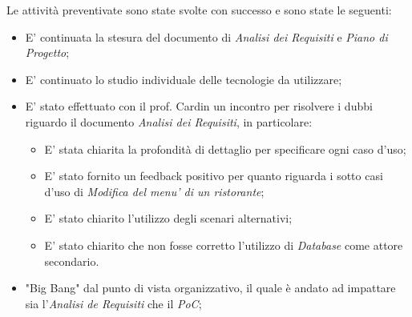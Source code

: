 Le attività preventivate sono state svolte con successo e sono state le seguenti:
\begin{itemize}
    \item E' continuata la stesura del documento di \emph{Analisi dei Requisiti} e \emph{Piano di Progetto};
    \item E' continuato lo studio individuale delle tecnologie da utilizzare;
    \item E' stato effettuato con il prof. Cardin un incontro per risolvere i dubbi riguardo il documento \emph{Analisi dei Requisiti}, in particolare:
    \begin{itemize}
        \item E' stata chiarita la profondità di dettaglio per specificare ogni caso d'uso;
        \item E' stato fornito un feedback positivo per quanto riguarda i sotto casi d'uso di \emph{Modifica del menu' di un ristorante};
        \item E' stato chiarito l'utilizzo degli scenari alternativi;
        \item E' stato chiarito che non fosse corretto l'utilizzo di \emph{Database} come attore secondario.
    \end{itemize}
    \item "Big Bang" dal punto di vista organizzativo, il quale è andato ad impattare sia l'\emph{Analisi de Requisiti} che il \emph{PoC};
\end{itemize}
